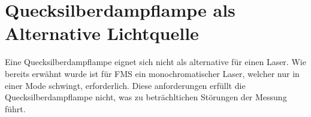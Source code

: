 
\section{Quecksilberdampflampe als Alternative Lichtquelle}

Eine Quecksilberdampflampe eignet sich nicht als alternative für einen Laser. Wie bereits erwähnt wurde ist für FMS ein monochromatischer Laser, welcher nur in einer Mode schwingt, erforderlich. Diese anforderungen erfüllt die Quecksilberdampflampe nicht, was zu beträchltichen Störungen der Messung führt.